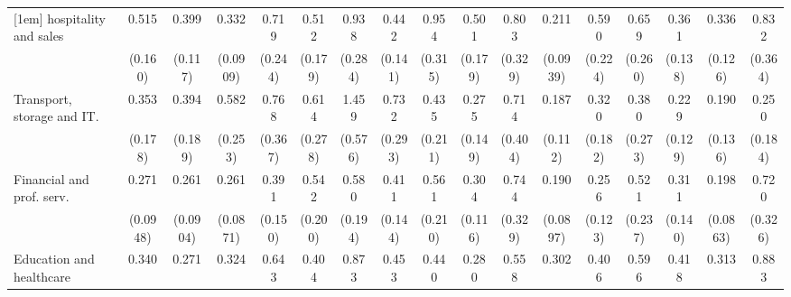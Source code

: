 {\begin{tabular}{l*{16}{c}}
[1em]
hospitality and sales&       0.515\sym{*}  &       0.399\sym{**} &       0.332\sym{***}&       0.719         &       0.512         &       0.938         &       0.442\sym{*}  &       0.954         &       0.501         &       0.803         &       0.211\sym{***}&       0.590         &       0.659         &       0.361\sym{**} &       0.336\sym{**} &       0.832         \\
                    &     (0.160)         &     (0.117)         &    (0.0909)         &     (0.244)         &     (0.179)         &     (0.284)         &     (0.141)         &     (0.315)         &     (0.179)         &     (0.329)         &    (0.0939)         &     (0.224)         &     (0.260)         &     (0.138)         &     (0.126)         &     (0.364)         \\
[1em]
Transport, storage and IT.&       0.353\sym{*}  &       0.394         &       0.582         &       0.768         &       0.614         &       1.459         &       0.732         &       0.435         &       0.275\sym{*}  &       0.714         &       0.187\sym{**} &       0.320\sym{*}  &       0.380         &       0.229\sym{**} &       0.190\sym{*}  &       0.250         \\
                    &     (0.178)         &     (0.189)         &     (0.253)         &     (0.367)         &     (0.278)         &     (0.576)         &     (0.293)         &     (0.211)         &     (0.149)         &     (0.404)         &     (0.112)         &     (0.182)         &     (0.273)         &     (0.129)         &     (0.136)         &     (0.184)         \\
[1em]
Financial and prof. serv.&       0.271\sym{***}&       0.261\sym{***}&       0.261\sym{***}&       0.391\sym{*}  &       0.542         &       0.580         &       0.411\sym{*}  &       0.561         &       0.304\sym{**} &       0.744         &       0.190\sym{***}&       0.256\sym{**} &       0.521         &       0.311\sym{**} &       0.198\sym{***}&       0.720         \\
                    &    (0.0948)         &    (0.0904)         &    (0.0871)         &     (0.150)         &     (0.200)         &     (0.194)         &     (0.144)         &     (0.210)         &     (0.116)         &     (0.329)         &    (0.0897)         &     (0.123)         &     (0.237)         &     (0.140)         &    (0.0863)         &     (0.326)         \\
[1em]
Education and healthcare&       0.340\sym{**} &       0.271\sym{***}&       0.324\sym{***}&       0.643         &       0.404\sym{*}  &       0.873         &       0.453\sym{*}  &       0.440\sym{*}  &       0.280\sym{***}&       0.558         &       0.302\sym{**} &       0.406\sym{*}  &       0.596         &       0.418\sym{*}  &       0.313\sym{**} &       0.883         \\

\end{tabular}}
